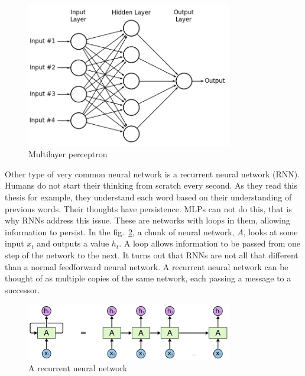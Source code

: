 \begin{figure}[H]
\includegraphics[width=0.8\textwidth,keepaspectratio]{figures/MLP.png}
\caption{Multilayer perceptron}
\label{Fig.MLP}
\end{figure}

Other type of very common neural network is a recurrent neural network (RNN). Humans do not start their thinking from scratch every second. As they read this thesis for example, they understand each word based on their understanding of previous words. Their thoughts have persistence. MLPs can not do this, that is why RNNs address this issue. These are networks with loops in them, allowing information to persist. In the fig.~\ref{Fig.RNN}, a chunk of neural network, $A$, looks at some input $x_t$ and outputs a value $h_t$. A loop allows information to be passed from one step of the network to the next. It turns out that RNNs are not all that different than a normal feedforward neural network. A recurrent neural network can be thought of as multiple copies of the same network, each passing a message to a successor.

\begin{figure}[H]
\includegraphics[width=0.8\textwidth,keepaspectratio]{figures/RNN.png}
\caption{A recurrent neural network \cite{Blog.RNNs}}
\label{Fig.RNN}
\end{figure}

